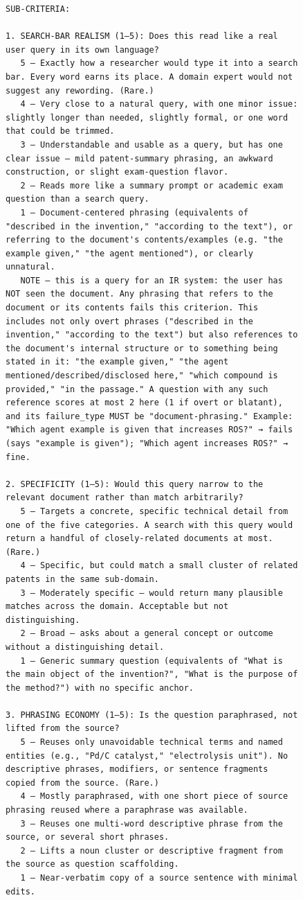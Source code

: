 \begin{figure}[h!]
\begin{minipage}{0.95\textwidth}
\begin{Verbatim}[breaklines=true, breakanywhere=true]
SUB-CRITERIA:

1. SEARCH-BAR REALISM (1–5): Does this read like a real user query in its own language?
   5 — Exactly how a researcher would type it into a search bar. Every word earns its place. A domain expert would not suggest any rewording. (Rare.)
   4 — Very close to a natural query, with one minor issue: slightly longer than needed, slightly formal, or one word that could be trimmed.
   3 — Understandable and usable as a query, but has one clear issue — mild patent-summary phrasing, an awkward construction, or slight exam-question flavor.
   2 — Reads more like a summary prompt or academic exam question than a search query.
   1 — Document-centered phrasing (equivalents of "described in the invention," "according to the text"), or referring to the document's contents/examples (e.g. "the example given," "the agent mentioned"), or clearly unnatural.
   NOTE — this is a query for an IR system: the user has NOT seen the document. Any phrasing that refers to the document or its contents fails this criterion. This includes not only overt phrases ("described in the invention," "according to the text") but also references to the document's internal structure or to something being stated in it: "the example given," "the agent mentioned/described/disclosed here," "which compound is provided," "in the passage." A question with any such reference scores at most 2 here (1 if overt or blatant), and its failure_type MUST be "document-phrasing." Example: "Which agent example is given that increases ROS?" → fails (says "example is given"); "Which agent increases ROS?" → fine.

2. SPECIFICITY (1–5): Would this query narrow to the relevant document rather than match arbitrarily?
   5 — Targets a concrete, specific technical detail from one of the five categories. A search with this query would return a handful of closely-related documents at most. (Rare.)
   4 — Specific, but could match a small cluster of related patents in the same sub-domain.
   3 — Moderately specific — would return many plausible matches across the domain. Acceptable but not distinguishing.
   2 — Broad — asks about a general concept or outcome without a distinguishing detail.
   1 — Generic summary question (equivalents of "What is the main object of the invention?", "What is the purpose of the method?") with no specific anchor.

3. PHRASING ECONOMY (1–5): Is the question paraphrased, not lifted from the source?
   5 — Reuses only unavoidable technical terms and named entities (e.g., "Pd/C catalyst," "electrolysis unit"). No descriptive phrases, modifiers, or sentence fragments copied from the source. (Rare.)
   4 — Mostly paraphrased, with one short piece of source phrasing reused where a paraphrase was available.
   3 — Reuses one multi-word descriptive phrase from the source, or several short phrases.
   2 — Lifts a noun cluster or descriptive fragment from the source as question scaffolding.
   1 — Near-verbatim copy of a source sentence with minimal edits.


\end{Verbatim}
\end{minipage}
\end{figure}
